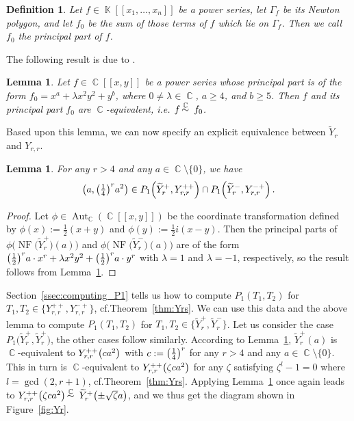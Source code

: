 \documentclass[noend]{amsproc}
\newtheorem{defn}[theorem]{Definition}
\newtheorem{lemma}[theorem]{Lemma}
\theoremstyle{definition}
\let\originalleft\left
\let\originalright\right
\renewcommand{\left}{\mathopen{}\mathclose\bgroup\originalleft}
\renewcommand{\right}{\aftergroup\egroup\originalright}
\newcommand{\tY}{\widetilde{Y}}
\DeclareMathOperator{\C}{\mathbb{C}}
\DeclareMathOperator{\K}{\mathbb{K}}
\DeclareMathOperator{\NF}{NF}
\DeclareMathOperator{\Aut}{Aut}
\DeclareMathOperator{\csim}{%
  \mathrel{%
    \raisebox{0pt}[\heightof{$\overset{\scriptscriptstyle\C}{\sim}$}]{%
      $\overset{\C}{\sim}$
    }
  }
}
\begin{document}
\begin{defn}
Let $f \in \K[[x_1,\ldots,x_n]]$ be a power series, let $\Gamma_f$ be its
Newton polygon, and let $f_0$ be the sum of those terms of $f$ which lie on
$\Gamma_f$. Then we call $f_0$ the principal part of $f$.
\end{defn}

The following result is due to \citet[Corollary~9.9]{A1974}.

\begin{lemma}\label{lem:principalpart}
Let $f \in \C[[x,y]]$ be a power series whose principal part is of the form
$f_0 = x^a+\lambda x^2y^2+y^b$, where $0 \neq \lambda \in \C$, $a \geq 4$, and
$b \geq 5$. Then $f$ and its principal part $f_0$ are $\C$-equivalent, i.e.\@
$f \csim f_0$.
\end{lemma}

Based upon this lemma, we can now specify an explicit equivalence between
$\tY_r$ and $Y_{r,r}$.

\begin{lemma}\label{lem:Yr_equivalences}
For any $r > 4$ and any $a \in \C \setminus \{0\}$, we have
\[
\left(a, \left(\textstyle\frac{1}{4}\right)^r a^2\right)
\in P_1\left(\tY_r^+, Y_{r,r}^{++}\right)
\cap P_1\left(\tY_r^-, Y_{r,r}^{-+}\right) \,.
\]
\end{lemma}

\begin{proof}
Let $\phi \in \Aut_{\C}(\C[[x,y]])$ be the coordinate transformation defined by
$\phi(x) := \frac{1}{2}(x+y)$ and $\phi(y) := \frac{1}{2}i(x-y)$. Then the
principal parts of $\phi\bigl(\NF\bigl(\tY_r^+\bigr)(a)\bigr)$ and
$\phi\bigl(\NF\bigl(\tY_r^-\bigr)(a)\bigr)$ are of the form
$\left(\frac{1}{2}\right)^r a \cdot x^r + \lambda x^2 y^2
+ \left(\frac{1}{2}\right)^r a \cdot y^r$
with $\lambda = 1$ and $\lambda = -1$, respectively, so the result follows from
Lemma~\ref{lem:principalpart}.
\end{proof}

Section~\ref{ssec:computing_P1} tells us how to compute $P_1(T_1, T_2)$ for
$T_1, T_2 \in \{Y_{r,r}^{++}, Y_{r,r}^{-+}\}$, cf.\@ Theorem~\ref{thm:Yrs}. We
can use this data and the above lemma to compute $P_1(T_1, T_2)$ for
$T_1, T_2 \in \bigl\{\tY_r^+, \tY_r^-\bigr\}$. Let us consider the case
$P_1\bigl(\tY_r^+, \tY_r^+\bigr)$, the other cases follow similarly. According
to Lemma~\ref{lem:Yr_equivalences}, $\tY_r^+(a)$ is $\C$-equivalent to
$Y_{r,r}^{++}\left(ca^2\right)$ with $c := \left(\frac{1}{4}\right)^r$ for any
$r > 4$ and any $a \in \C \setminus \{0\}$. This in turn is $\C$-equivalent to
$Y_{r,r}^{++}\left(\zeta ca^2\right)$ for any $\zeta$ satisfying
$\zeta^l-1 = 0$ where $l = \gcd(2, r+1)$, cf.\@ Theorem~\ref{thm:Yrs}. Applying
Lemma~\ref{lem:Yr_equivalences} once again leads to
$Y_{r,r}^{++}\left(\zeta ca^2\right)
\csim \tY_r^+\left(\pm \sqrt{\zeta}a\right)$, and we thus get the diagram shown
in Figure~\ref{fig:Yr}.
\end{document}
